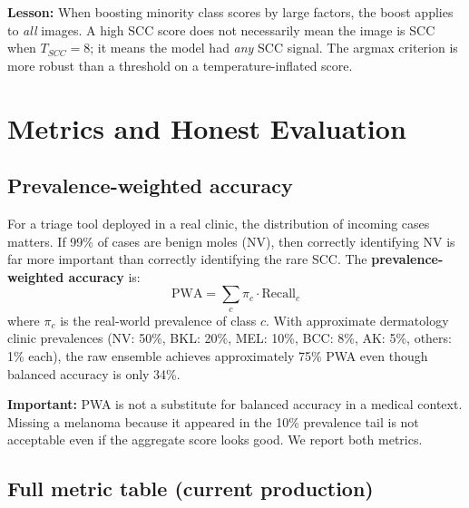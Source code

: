 \documentclass[12pt,a4paper]{article}
\begin{document}
\textbf{Lesson:} When boosting minority class scores by large factors, the boost applies to
\emph{all} images. A high SCC score does not necessarily mean the image is SCC when $T_{SCC}
= 8$; it means the model had \emph{any} SCC signal. The argmax criterion is more robust than
a threshold on a temperature-inflated score.

\section{Metrics and Honest Evaluation}

\subsection{Prevalence-weighted accuracy}

For a triage tool deployed in a real clinic, the distribution of incoming cases matters. If
99\% of cases are benign moles (NV), then correctly identifying NV is far more important
than correctly identifying the rare SCC. The \textbf{prevalence-weighted accuracy} is:
\[
\text{PWA} = \sum_{c} \pi_c \cdot \text{Recall}_c
\]
where $\pi_c$ is the real-world prevalence of class $c$. With approximate dermatology clinic
prevalences (NV: 50\%, BKL: 20\%, MEL: 10\%, BCC: 8\%, AK: 5\%, others: 1\% each), the
raw ensemble achieves approximately 75\% PWA even though balanced accuracy is only 34\%.

\textbf{Important:} PWA is not a substitute for balanced accuracy in a medical context.
Missing a melanoma because it appeared in the 10\% prevalence tail is not acceptable even if
the aggregate score looks good. We report both metrics.

\subsection{Full metric table (current production)}
\end{document}
